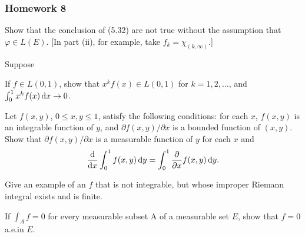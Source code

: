 \subsubsection{Homework 8}
\setcounter{exercise}{0}
\setcounter{equation}{0}

\begin{problem}
  Show that the conclusion of (5.32) are not true without the assumption
  that \(\varphi\in L(E)\). [In part (ii), for example, take
  \(f_k=\chi_{(k,\infty)}\).]
\end{problem}
\begin{solution}
  Suppose
\end{solution}

\begin{problem}
  If \(f\in L(0,1)\), show that \(x^kf(x)\in L(0,1)\) for \(k=1,2,\dotsc\),
  and \(\int_0^1 x^kf(x)\mathop{}\!\mathrm{d} x\to 0\).
\end{problem}
\begin{solution}
\end{solution}

\begin{problem}
  Let \(f(x,y)\), \(0\leq x,y\leq 1\), satisfy the following conditions:
  for each \(x\), \(f(x,y)\) is an integrable function of \(y\), and
  \(\partial f(x,y)/\partial x\) is a bounded function of \((x,y)\). Show
  that \(\partial f(x,y)/\partial x\) is a measurable function of \(y\) for
  each \(x\) and
  \[
    \frac{\mathrm{d}}{\mathrm{d} x}\int_0^1f(x,y)\mathop{}\!\mathrm{d}
    y=\int_0^1\frac{\partial}{\partial x}f(x,y)\mathop{}\!\mathrm{d} y.
  \]
\end{problem}
\begin{solution}
\end{solution}

\begin{problem}
  Give an example of an \(f\) that is not integrable, but whose improper
  Riemann integral exists and is finite.
\end{problem}
\begin{solution}
\end{solution}

\begin{problem}
  If \(\int_A f=0\) for every measurable subset A of a measurable set
  \(E\), show that \(f=0\) a.e.\@ in \(E\).
\end{problem}
\begin{solution}
\end{solution}

